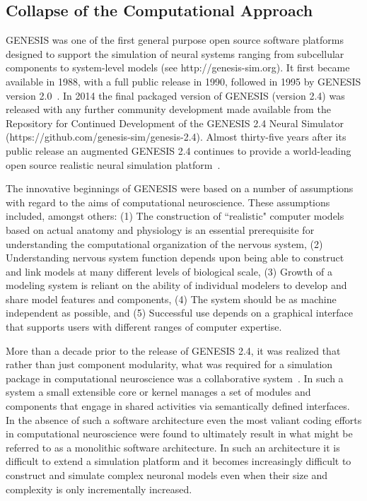 \documentclass[11pt,3p,twocolumn]{JMN}
\begin{document}
\subsection{Collapse of the Computational Approach}

GENESIS was one of the first general purpose open source software platforms designed to support the simulation of neural systems ranging from subcellular components to system-level models (see http://genesis-sim.org). It first became available in 1988, with a full public release in 1990, followed in 1995 by GENESIS version 2.0~\citep{jung22}. In 2014 the final packaged version of GENESIS (version 2.4) was released with any further community development made available from the Repository for Continued Development of the GENESIS 2.4 Neural Simulator (https://github.com/genesis-sim/genesis-2.4). Almost thirty-five years after its public release an augmented GENESIS 2.4 continues to provide a world-leading open source realistic neural simulation platform~\citep[see Table\,1 in][]{tikidji-hamburyan17}.

The innovative beginnings of GENESIS were based on a number of assumptions with regard to the aims of computational neuroscience. These assumptions included, amongst others: (1) The construction of ``realistic" computer models based on actual anatomy and physiology is an essential prerequisite for understanding the computational organization of the nervous system, (2) Understanding nervous system function depends upon being able to construct and link models at many different levels of biological scale, (3) Growth of a modeling system is reliant on the ability of individual modelers to develop and share model features and components, (4) The system should be as machine independent as possible, and (5) Successful use depends on a graphical interface that supports users with different ranges of computer expertise.

More than a decade prior to the release of GENESIS 2.4, it was realized that rather than just component modularity, what was required for a simulation package in computational neuroscience was a collaborative system~\citep{cornelis03}. In such a system a small extensible core or kernel manages a set of modules and components that engage in shared activities via semantically defined interfaces. In the absence of such a software architecture even the most valiant coding efforts in computational neuroscience were found to ultimately result in what might be referred to as a monolithic software architecture. In such an architecture it is difficult to extend a simulation platform and it becomes increasingly difficult to construct and simulate complex neuronal models even when their size and complexity is only incrementally increased.
\end{document}
